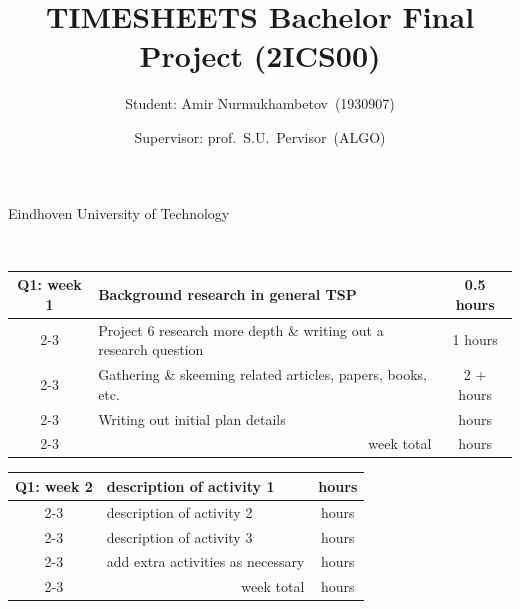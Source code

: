 \documentclass[report,english,cleveref,autoref]{lipics-v2021}
\newcommand{\myname}{Amir Nurmukhambetov}             %
\newcommand{\myshortname}{A.L.~Gorithm}             %
\newcommand{\mystudentid}{1930907}                %
\newcommand{\mysupervisor}{prof.~S.U.~Pervisor}     %
\begin{document}

\title{TIMESHEETS Bachelor Final Project (2ICS00)}
\author{Student: \myname~(\mystudentid)}{Eindhoven University of Technology}{}{}{}
\author{Supervisor: \mysupervisor~(ALGO)}{$\mbox{}$}{}{}{}
\authorrunning{\myshortname}

\maketitle

\begin{tabular}{c| m{10cm}|c}
\hline\hline
Q1: week 1  & Background research in general TSP & 0.5 hours \\
\cline{2-3}
     & Project 6 research more depth \& writing out a research question & 1 hours \\
\cline{2-3}
     & Gathering \& skeeming related articles, papers, books, etc. & 2 +  hours \\
\cline{2-3}
     & Writing out initial plan details & hours \\
\cline{2-3}
     & \multicolumn{1}{r|}{week total} & hours \\
\hline \hline 
\end{tabular}
\medskip

\begin{tabular}{c| m{10cm}|c}
\hline\hline
Q1: week 2  & description of activity 1 & hours \\
\cline{2-3}
     & description of activity 2 & hours \\
\cline{2-3}
     & description of activity 3 & hours \\
\cline{2-3}
     & add extra activities as necessary & hours \\
\cline{2-3}
     & \multicolumn{1}{r|}{week total} & hours \\
\hline \hline
\end{tabular}
\medskip
\end{document}
